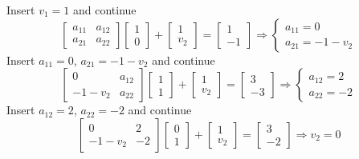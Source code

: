 \documentclass[]{article}
\begin{document}
Insert $v_1 = 1$ and continue \begin{equation}
\left[\begin{array}{cc}
a_{11}&a_{12}\\
a_{21}&a_{22}
\end{array}\right]\left[\begin{array}{c}
1\\
0
\end{array}\right] + \left[\begin{array}{c}
1\\
v_2
\end{array}\right] = \left[\begin{array}{c}
1\\
-1
\end{array}\right]\Rightarrow \left\{\begin{array}{c}
a_{11}=0\\
a_{21}=-1-v_2
\end{array} \right.\label{second}
\end{equation}
Insert $a_{11}=0$, $a_{21}=-1-v_2$ and continue \begin{equation}
\left[\begin{array}{cc}
0&a_{12}\\
-1-v_2&a_{22}
\end{array}\right]\left[\begin{array}{c}
1\\
1
\end{array}\right] + \left[\begin{array}{c}
1\\
v_2
\end{array}\right] = \left[\begin{array}{c}
3\\
-3
\end{array}\right]\Rightarrow \left\{\begin{array}{c}
a_{12}=2\\
a_{22}=-2
\end{array} \right.\label{third}
\end{equation}
Insert $a_{12}=2$, $a_{22}=-2$ and continue\begin{equation}
\left[\begin{array}{cc}
0&2\\
-1-v_2&-2
\end{array}\right]\left[\begin{array}{c}
0\\
1
\end{array}\right] + \left[\begin{array}{c}
1\\
v_2
\end{array}\right] = \left[\begin{array}{c}
3\\
-2
\end{array}\right]\Rightarrow v_2 = 0\label{fourth}
\end{equation}
\end{document}
